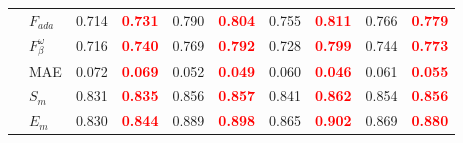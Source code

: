 \documentclass[runningheads]{llncs}
\begin{document}
\begin{table}[H]
{\begin{tabular}{l|l|cc|cc|cc|cc}
                                               & $F_{ada}$                                                   & 0.714                           & \textcolor{red}{\textbf{0.731}} & 0.790                           & \textcolor{red}{\textbf{0.804}} & 0.755 & \textcolor{red}{\textbf{0.811}} & 0.766                           & \textcolor{red}{\textbf{0.779}} \\
                                               & $F^{\omega}_{\beta}$                                        & 0.716                           & \textcolor{red}{\textbf{0.740}} & 0.769                           & \textcolor{red}{\textbf{0.792}} & 0.728 & \textcolor{red}{\textbf{0.799}} & 0.744                           & \textcolor{red}{\textbf{0.773}} \\
                                               & MAE                                                         & 0.072                           & \textcolor{red}{\textbf{0.069}} & 0.052                           & \textcolor{red}{\textbf{0.049}} & 0.060 & \textcolor{red}{\textbf{0.046}} & 0.061                           & \textcolor{red}{\textbf{0.055}} \\
                                               & $S_{m}$                                                     & 0.831                           & \textcolor{red}{\textbf{0.835}} & 0.856                           & \textcolor{red}{\textbf{0.857}} & 0.841 & \textcolor{red}{\textbf{0.862}} & 0.854                           & \textcolor{red}{\textbf{0.856}} \\
                                               & $E_{m}$                                                     & 0.830                           & \textcolor{red}{\textbf{0.844}} & 0.889                           & \textcolor{red}{\textbf{0.898}} & 0.865 & \textcolor{red}{\textbf{0.902}} & 0.869                           & \textcolor{red}{\textbf{0.880}} \\ \bottomrule
  \end{tabular}}
\end{table}



\end{document}
